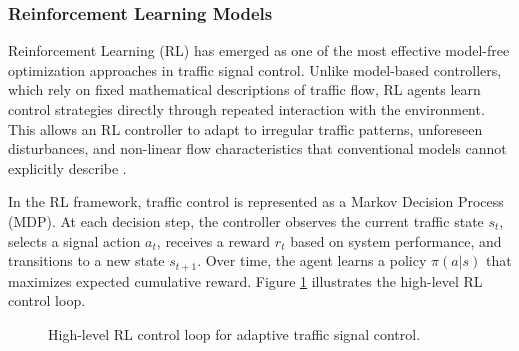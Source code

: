 \documentclass[11pt, a4paper]{report}
\begin{document}
\subsubsection{Reinforcement Learning Models}

Reinforcement Learning (RL) has emerged as one of the most effective model-free optimization approaches in traffic signal control. Unlike model-based controllers, which rely on fixed mathematical descriptions of traffic flow, RL agents learn control strategies directly through repeated interaction with the environment. This allows an RL controller to adapt to irregular traffic patterns, unforeseen disturbances, and non-linear flow characteristics that conventional models cannot explicitly describe \cite{futuretransp5040137}.

In the RL framework, traffic control is represented as a Markov Decision Process (MDP). At each decision step, the controller observes the current traffic state $s_t$, selects a signal action $a_t$, receives a reward $r_t$ based on system performance, and transitions to a new state $s_{t+1}$. Over time, the agent learns a policy $\pi(a|s)$ that maximizes expected cumulative reward. Figure \ref{fig:rl_overall_block} illustrates the high-level RL control loop.

\begin{figure}[H]
\centering
{}
\caption{High-level RL control loop for adaptive traffic signal control.}
\label{fig:rl_overall_block}
\end{figure}
\end{document}
